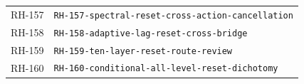 \begin{longtable}{r >{\raggedright\arraybackslash}p{}}
RH-157 & \texttt{RH-\allowbreak{}157-\allowbreak{}spectral-\allowbreak{}reset-\allowbreak{}cross-\allowbreak{}action-\allowbreak{}cancellation}\\
RH-158 & \texttt{RH-\allowbreak{}158-\allowbreak{}adaptive-\allowbreak{}lag-\allowbreak{}reset-\allowbreak{}cross-\allowbreak{}bridge}\\
RH-159 & \texttt{RH-\allowbreak{}159-\allowbreak{}ten-\allowbreak{}layer-\allowbreak{}reset-\allowbreak{}route-\allowbreak{}review}\\
RH-160 & \texttt{RH-\allowbreak{}160-\allowbreak{}conditional-\allowbreak{}all-\allowbreak{}level-\allowbreak{}reset-\allowbreak{}dichotomy}\\
\bottomrule
\end{longtable}
